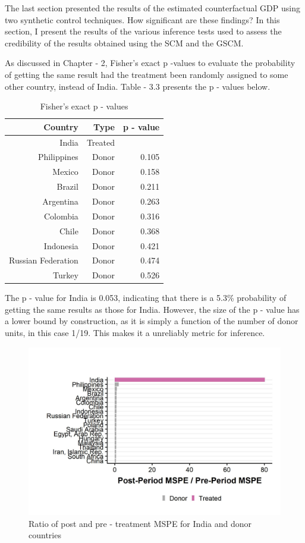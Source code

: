 \documentclass[12pt,nobind, a4paper]{reedthesis}
\begin{document}
 The last section presented the results of the estimated counterfactual GDP using two synthetic control techniques. How significant are these findings? In this section, I present the results of the various inference tests used to assess the credibility of the results obtained using the SCM and the GSCM.
 \linebreak

 As discussed in Chapter - 2, Fisher's exact p -values to evaluate the probability of getting the same result had the treatment been randomly assigned to some other country, instead of India. Table - 3.3 presents the p - values below.
 \linebreak
 \begin{table}[h!!]
 \centering
 \begin{tabular}{rrr}
 \hline
 Country& Type & p - value\\
 \hline
 India & Treated & \B 0.053\\
 \hline
 Philippines & Donor & 0.105\\
 \hline
 Mexico & Donor & 0.158\\
 \hline
 Brazil & Donor & 0.211\\
 \hline
 Argentina & Donor & 0.263\\
 \hline
 Colombia & Donor & 0.316\\
 \hline
 Chile & Donor & 0.368\\
 \hline
 Indonesia & Donor & 0.421\\
 \hline
 Russian Federation & Donor & 0.474\\
 \hline
 Turkey & Donor & 0.526\\
 \hline
 \end{tabular}
 \caption{Fisher's exact p - values}
 \end{table}
 The p - value for India is 0.053, indicating that there is a 5.3\% probability of getting the same results as those for India. However, the size of the p - value has a lower bound by construction, as it is simply a function of the number of donor units, in this case 1/19. This makes it a unreliably metric for inference.
 \begin{figure}

 {\centering \includegraphics[width=1\linewidth]{figure/msperatio} 

 }

 \caption{Ratio of post and pre - treatment MSPE for India and donor countries}\label{fig:msper}
 \end{figure}
\end{document}
